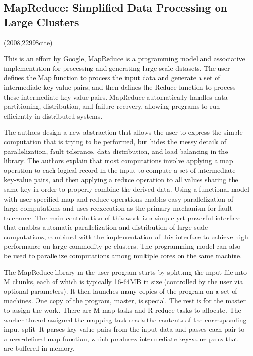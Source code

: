 \documentclass[a4paper,twoside]{scrbook}
\begin{document}
\subsection{MapReduce: Simplified Data Processing on Large Clusters \cite{dean2008mapreduce}}
(2008,22998cite)\par
This is an effort by Google, MapReduce is a programming model and associative implementation for processing and generating large-scale datasets. The user defines the Map function to process the input data and generate a set of intermediate key-value pairs, and then defines the Reduce function to process these intermediate key-value pairs.
MapReduce automatically handles data partitioning, distribution, and failure recovery, allowing programs to run efficiently in distributed systems.
\par
The authors design a new abstraction that allows the user to express the simple computation that is trying to be performed, but hides the messy details of parallelization, fault tolerance, data distribution, and load balancing in the library.
The authors explain that most computations involve applying a map operation to each logical record in the input to compute a set of intermediate key-value pairs, and then applying a reduce operation to all values sharing the same key in order to properly combine the derived data. Using a functional model with user-specified map and reduce operations enables easy parallelization of large computations and uses reexecution as the primary mechanism for fault tolerance.
The main contribution of this work is a simple yet powerful interface that enables automatic parallelization and distribution of large-scale computations, combined with the implementation of this interface to achieve high performance on large commodity pc clusters. The programming model can also be used to parallelize computations among multiple cores on the same machine.
\par
The MapReduce library in the user program starts by splitting the input file into M chunks, each of which is typically 16-64MB in size (controlled by the user via optional parameters). It then launches many copies of the program on a set of machines.
One copy of the program, master, is special. The rest is for the master to assign the work. There are M map tasks and R reduce tasks to allocate.
The worker thread assigned the mapping task reads the contents of the corresponding input split. It parses key-value pairs from the input data and passes each pair to a user-defined map function, which produces intermediate key-value pairs that are buffered in memory.
\end{document}
